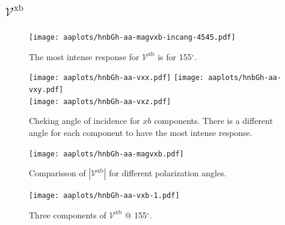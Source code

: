 \documentclass{article}
\let\Oldsubsection\subsection
\renewcommand{\subsection}{\FloatBarrier\Oldsubsection}
\begin{document}
\subsection{$\mathcal{V}^{\mathrm{xb}} $}
\begin{figure}[h!]
    \centering
    \texttt{[image: aaplots/hnbGh-aa-magvxb-incang-4545.pdf]}
    \caption{The most intense response for $\mathcal{V}^{\mathrm{xb}} $ is for 
    155$^{\circ}$.}
    \label{fig:aa-magvxbincang}
\end{figure}
\begin{figure}[h!]
    \centering
    \texttt{[image: aaplots/hnbGh-aa-vxx.pdf]}
    \texttt{[image: aaplots/hnbGh-aa-vxy.pdf]}\\
    \texttt{[image: aaplots/hnbGh-aa-vxz.pdf]}
    \caption{Cheking angle of incidence for $xb$ components. There is a
    different angle for each component to have the most intense response.}
    \label{fig:aa-xbangcomp}
\end{figure}
\begin{figure}[ht!]
    \centering
    \texttt{[image: aaplots/hnbGh-aa-magvxb.pdf]}
    \caption{Comparisson of $|\mathcal{V}^{\mathrm{xb}}|$ for different
    polarization angles.}
    \label{fig:aa-magvxb}
\end{figure}
\begin{figure}[ht!]
    \centering
    \texttt{[image: aaplots/hnbGh-aa-vxb-1.pdf]}
    \caption{Three components of $\mathcal{V}^{\mathrm{xb}} $ @ 155$^{\circ}$.}
    \label{fig:aa-vxb1}
\end{figure}

\clearpage

\end{document}
